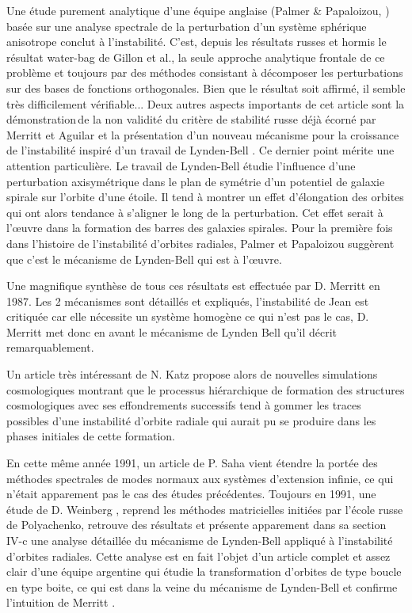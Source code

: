 Une \'{e}tude purement analytique d'une \'{e}quipe anglaise (Palmer \&
Papaloizou, \cite{palmerpapa}) bas\'{e}e sur une analyse spectrale de la perturbation
d'un syst\`{e}me sph\'{e}rique anisotrope conclut \`{a} l'instabilit\'{e}.
C'est, depuis les r\'{e}sultats russes et hormis le r\'{e}sultat water-bag
de Gillon et al., la seule approche analytique frontale de ce probl\`{e}me et
toujours par des m\'{e}thodes consistant \`{a} d\'{e}composer les
perturbations sur des bases de fonctions orthogonales. Bien que le
r\'{e}sultat soit affirm\'{e}, il semble tr\`{e}s difficilement
v\'{e}rifiable... Deux autres aspects importants de cet article sont
la \og démonstration\fg\,de la non validit\'{e} du crit\`{e}re de stabilit\'{e} russe
déjà \'{e}corn\'{e} par Merritt et Aguilar et la pr\'{e}sentation d'un
nouveau m\'{e}canisme pour la croissance de l'instabilit\'{e} inspir\'{e} d'un
travail de Lynden-Bell \cite{lyndenbell}. Ce dernier point m\'{e}rite une attention
particuli\`{e}re. Le travail de Lynden-Bell \'{e}tudie l'influence d'une
perturbation axisym\'{e}trique dans le plan de sym\'{e}trie d'un potentiel de
galaxie spirale sur l'orbite d'une \'{e}toile. Il tend \`{a} montrer un effet
d'\'{e}longation des orbites qui ont alors tendance \`{a} s'aligner le long de
la perturbation. Cet effet serait \`{a} l'\oe uvre dans la formation des
barres des galaxies spirales. Pour la premi\`{e}re fois dans l'histoire de
l'instabilit\'{e} d'orbites radiales, Palmer et Papaloizou sugg\`{e}rent que
c'est le m\'{e}canisme de Lynden-Bell qui est \`{a} l'\oe uvre.

Une magnifique synth\`{e}se de tous ces r\'{e}sultats est effectu\'{e}e par
D. Merritt  \cite{merritt1987} en 1987. Les 2 m\'{e}canismes sont
d\'{e}taill\'{e}s et expliqu\'{e}s, l'instabilit\'{e} de Jean est
critiqu\'{e}e car elle nécessite un syst\`{e}me homog\`{e}ne ce qui
n'est pas le cas, D. Merritt met donc en avant le m\'{e}canisme de Lynden
Bell qu'il d\'{e}crit remarquablement.
 
Un article très intéressant de N. Katz \cite{katz} propose alors de nouvelles simulations cosmologiques montrant que le processus hiérarchique de formation des structures cosmologiques avec ses effondrements successifs tend à gommer les traces possibles d'une instabilité d'orbite radiale qui aurait pu se produire dans les phases initiales de cette formation. 

En cette
m\^{e}me ann\'{e}e 1991, un article de P. Saha \cite{saha} vient \'{e}tendre la
port\'{e}e des m\'{e}thodes spectrales de modes normaux aux syst\`{e}mes
d'extension infinie, ce qui n'\'{e}tait apparement pas le cas des \'{e}tudes
pr\'{e}c\'{e}dentes. Toujours en 1991, une \'{e}tude de D. Weinberg
\cite{weinberg}, reprend les m\'{e}thodes matricielles initi\'{e}es par
l'\'{e}cole russe de Polyachenko, retrouve des r\'{e}sultats et pr\'{e}sente
apparement dans sa section IV-c une analyse d\'{e}taill\'{e}e du m\'{e}canisme
de Lynden-Bell appliqu\'{e} \`{a} l'instabilit\'{e} d'orbites radiales. Cette analyse est en fait l'objet d'un article
complet et assez clair d'une \'{e}quipe argentine \cite{cincotta} qui \'{e}tudie la transformation
d'orbites de type boucle en type boite, ce qui est dans la veine du
m\'{e}canisme de Lynden-Bell et confirme l'intuition de Merritt \cite{merritt1987}.

